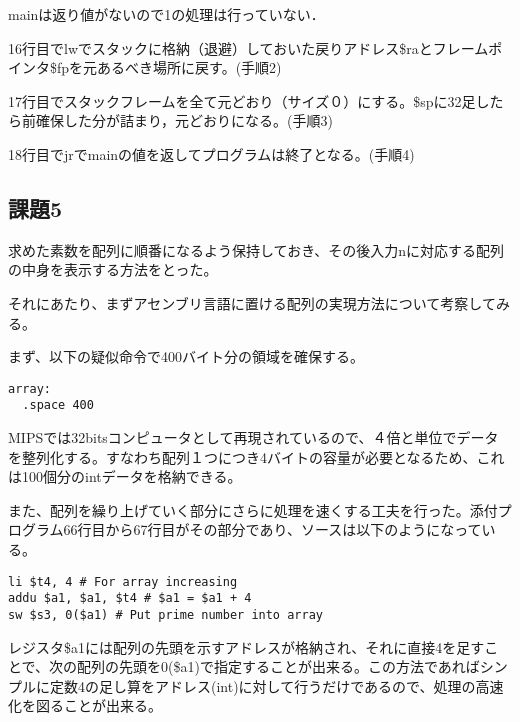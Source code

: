 \documentclass[a4j]{jarticle}
\begin{document}
mainは返り値がないので1の処理は行っていない．

16行目でlwでスタックに格納（退避）しておいた戻りアドレス\$raとフレームポインタ\$fpを元あるべき場所に戻す。(手順2)

17行目でスタックフレームを全て元どおり（サイズ０）にする。\$spに32足したら前確保した分が詰まり，元どおりになる。(手順3)

18行目でjrでmainの値を返してプログラムは終了となる。(手順4)



\subsection{課題5}



求めた素数を配列に順番になるよう保持しておき、その後入力nに対応する配列の中身を表示する方法をとった。

それにあたり、まずアセンブリ言語に置ける配列の実現方法について考察してみる。

まず、以下の疑似命令で400バイト分の領域を確保する。\\



\begin{lstlisting}
array:
  .space 400
\end{lstlisting}


MIPSでは32bitsコンピュータとして再現されているので、４倍と単位でデータを整列化する。すなわち配列１つにつき4バイトの容量が必要となるため、これは100個分のintデータを格納できる。

また、配列を繰り上げていく部分にさらに処理を速くする工夫を行った。添付プログラム66行目から67行目がその部分であり、ソースは以下のようになっている。\\

\begin{lstlisting}
li $t4, 4 # For array increasing
addu $a1, $a1, $t4 # $a1 = $a1 + 4
sw $s3, 0($a1) # Put prime number into array
\end{lstlisting}

レジスタ\$a1には配列の先頭を示すアドレスが格納され、それに直接4を足すことで、次の配列の先頭を0(\$a1)で指定することが出来る。この方法であればシンプルに定数4の足し算をアドレス(int)に対して行うだけであるので、処理の高速化を図ることが出来る。
\end{document}
